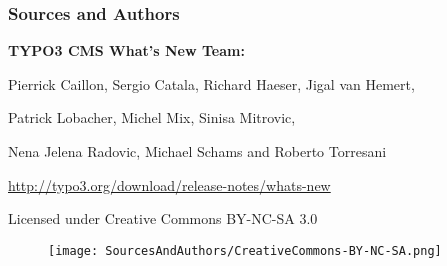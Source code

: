 \begin{frame}[fragile]
	\frametitle{Sources and Authors}

	\vspace{-0.6cm}

	\centerline{\textbf{TYPO3 CMS What's New Team:}}

	\begin{center}
		\centerline{Pierrick Caillon, Sergio Catala, Richard Haeser, Jigal van Hemert,}
		\centerline{Patrick Lobacher, Michel Mix, Sinisa Mitrovic,}
		\centerline{Nena Jelena Radovic, Michael Schams and Roberto Torresani}
	\end{center}

	\vspace{0.4cm}

	\smaller\begin{center}\url{http://typo3.org/download/release-notes/whats-new}\end{center}\normalsize

	\vspace{1cm}

	\smaller\begin{center}Licensed under Creative Commons BY-NC-SA 3.0\end{center}\normalsize
	\begin{figure}\vspace*{-0.4cm}
		\texttt{[image: SourcesAndAuthors/CreativeCommons-BY-NC-SA.png]}
	\end{figure}

\end{frame}

